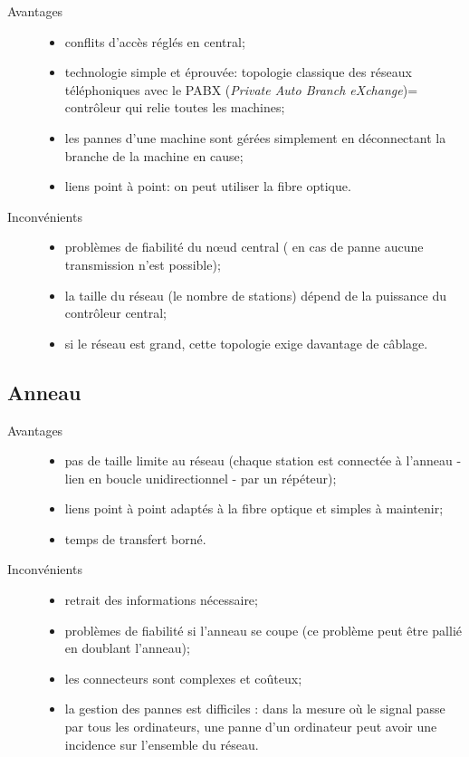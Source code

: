 \documentclass[11pt,english,french]{scrreprt}
\theoremstyle{remark}
\theoremstyle{definition}
\begin{document}
\begin{description}
	\item [Avantages]
	\begin{itemize}
		\item conflits d'accès réglés en central;
		\item technologie simple et éprouvée: topologie classique des réseaux téléphoniques avec le PABX (\emph{Private Auto Branch eXchange})= contrôleur qui relie toutes les machines;
		\item les pannes d'une machine sont gérées simplement en déconnectant la branche de la machine en cause;
		\item liens point à point: on peut utiliser la fibre optique.
	\end{itemize}
	\item [Inconvénients]
	\begin{itemize}
		\item problèmes de fiabilité du nœud central ( en cas de panne aucune transmission n'est possible);
		\item la taille du réseau (le nombre de stations) dépend de la puissance du contrôleur central;
		\item si le réseau est grand, cette topologie exige davantage de câblage.
	\end{itemize}
\end{description}

\subsection{Anneau} %

\begin{description}
	\item [Avantages]\hfill
	\begin{itemize}
		\item pas de taille limite au réseau (chaque station est connectée à l'anneau - lien en boucle unidirectionnel - par un répéteur);
		\item liens point à point adaptés à la fibre optique et simples à maintenir;
		\item temps de transfert borné.
	\end{itemize}
	\item [Inconvénients]\hfill
	\begin{itemize}
		\item retrait des informations nécessaire;
		\item problèmes de fiabilité si l'anneau se coupe (ce problème peut être pallié en doublant l'anneau);
		\item les connecteurs sont complexes et coûteux;
		\item la gestion des pannes est difficiles : dans la mesure où le signal passe par tous les ordinateurs, une panne d'un ordinateur peut avoir une incidence sur l'ensemble du réseau.
	\end{itemize}
\end{description}
\end{document}
